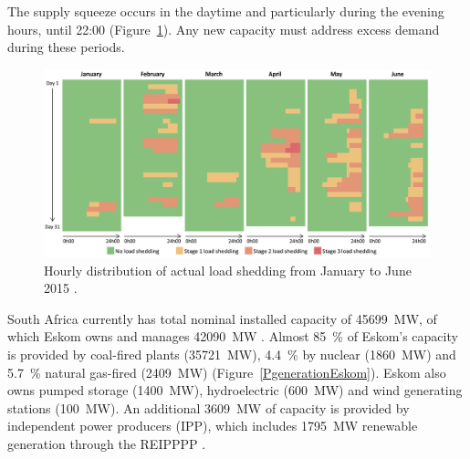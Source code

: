 
The supply squeeze occurs in the daytime and particularly during the evening hours, until 22:00 (Figure~\ref{Load_shedding}). Any new capacity must address excess demand during these periods.

\begin{figure}[htbp]  
\centering
\includegraphics[width=1\linewidth]{FIG/Load_shedding}
\caption[Hourly distribution of load shedding from January to June 2015.]{Hourly distribution of actual load shedding from January to June 2015 \cite{CSIREnergyCentre2015}.}\label{Load_shedding}
\end{figure}


South Africa currently has total nominal installed capacity of \SI{45699}{\mega\watt}, of which Eskom owns and manages \SI{42090}{\mega\watt} \cite{Eskom2015b}. Almost \SI{85}{\percent} of Eskom's capacity is provided by coal-fired plants (\SI{35721}{\mega\watt}), \SI{4.4}{\percent} by nuclear (\SI{1860}{\mega\watt}) and \SI{5.7}{\percent} natural gas-fired (\SI{2409}{\mega\watt}) (Figure~\ref{PgenerationEskom}). Eskom also owns pumped storage (\SI{1400}{\mega\watt}), hydroelectric (\SI{600}{\mega\watt}) and wind generating stations (\SI{100}{\mega\watt}). An additional \SI{3609}{\mega\watt} of capacity is provided by independent power producers (IPP), which includes \SI{1795}{\mega\watt} renewable generation through the \ac{REIPPPP} \cite{Eskom2015a}.


